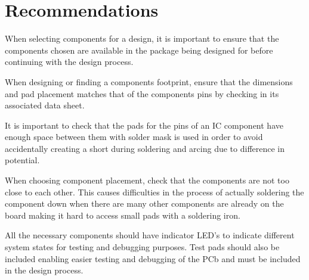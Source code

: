 \chapter{Recommendations}
When selecting components for a design, it is important to ensure that the components chosen are available in the package being designed for before continuing with the design process. 

When designing or finding a components footprint, ensure that the dimensions and pad placement matches that of the  components pins by checking in its associated data sheet. 

It is important to check that the pads for the pins of an IC component have enough space between them with solder mask is used in order to avoid accidentally creating a short during soldering and arcing due to difference in potential. 

When choosing component placement, check that the components are not too close to each other. This causes difficulties in the process of actually soldering the component down when there are many other components are already on the board making it hard to access small pads with a soldering iron.

All the necessary components should have indicator LED's to indicate different system states for testing and debugging purposes. Test pads should also be included enabling easier testing and debugging of the PCb and must be included in the design process.



